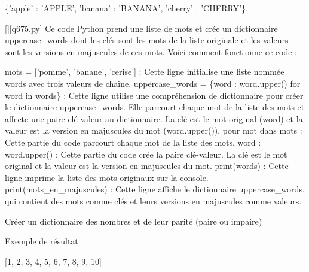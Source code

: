 \{'apple' : 'APPLE', 'banana' : 'BANANA', 'cherry' : 'CHERRY'\}.
        \par
        \begin{solution}
            \renewcommand{\nomfichier}{q675.py}
            \pythonfile{\chemincode \nomfichier}[][\nomfichier]
            Ce code Python prend une liste de mots et crée un dictionnaire uppercase\_words dont les clés sont les mots de la liste originale et les valeurs sont les versions en majuscules de ces mots. Voici comment fonctionne ce code :

    mots = ['pomme', 'banane', 'cerise'] : Cette ligne initialise une liste nommée words avec trois valeurs de chaîne.
    uppercase\_words = \{word : word.upper() for word in words\} : Cette ligne utilise une compréhension de dictionnaire pour créer le dictionnaire uppercase\_words. Elle parcourt chaque mot de la liste des mots et affecte une paire clé-valeur au dictionnaire. La clé est le mot original (word) et la valeur est la version en majuscules du mot (word.upper()).
        pour mot dans mots : Cette partie du code parcourt chaque mot de la liste des mots.
        word : word.upper() : Cette partie du code crée la paire clé-valeur. La clé est le mot original et la valeur est la version en majuscules du mot.
    print(words) : Cette ligne imprime la liste des mots originaux sur la console.
    print(mots\_en\_majuscules) : Cette ligne affiche le dictionnaire uppercase\_words, qui contient des mots comme clés et leurs versions en majuscules comme valeurs.
        \end{solution}
        

        \question
        Créer un dictionnaire des nombres et de leur parité (paire ou impaire)

Exemple de résultat

[1, 2, 3, 4, 5, 6, 7, 8, 9, 10]

